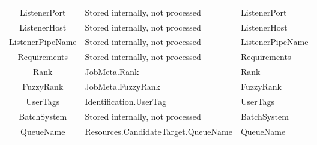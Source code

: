 \documentclass{article}
\newcommand{\NST}[1]{\normalsize{\textnormal{#1}}}
\begin{document}
\begin{center}
\begin{tabularx}{\textwidth}{CTT}
ListenerPort & \NST{Stored internally, not processed} & ListenerPort\\
ListenerHost & \NST{Stored internally, not processed} & ListenerHost\\
ListenerPipeName & \NST{Stored internally, not processed} & ListenerPipeName\\
Requirements & \NST{Stored internally, not processed} & Requirements\\
Rank & JobMeta.Rank & Rank\\
FuzzyRank & JobMeta.FuzzyRank & FuzzyRank\\
UserTags & Identification.UserTag & UserTags\\
BatchSystem & \NST{Stored internally, not processed} & BatchSystem\\
QueueName & Resources.CandidateTarget.QueueName & QueueName
\end{tabularx}
\end{center}
\end{document}
